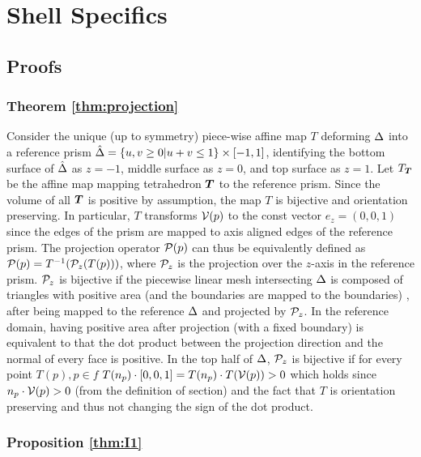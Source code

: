 \chapter{Shell Specifics}
\section{Proofs}
\subsection{Theorem \ref{thm:projection}}\label{app:projection}
Consider the unique (up to symmetry) piece-wise affine map $T$ deforming $\Prism$ into a reference prism $\hat\Prism = \{u,v \geq 0|u+v \leq 1\} \times [-1,1]$, identifying the bottom surface of $\hat\Prism$ as $z=-1$, middle surface as $z=0$, and top surface as $z=1$.
Let $T_{\Tet}$ be the affine map mapping tetrahedron $\Tet$ to the reference prism.
Since the volume of all $\Tet$ is positive by assumption, the map $T$ is bijective and orientation preserving. 
In particular, $T$ transforms $\V(p)$ to the const vector $e_z = (0,0,1)$ since the edges of the prism are mapped to axis aligned edges of the reference prism. The projection operator $\P(p)$ can thus be equivalently defined as $\P(p) = T^{-1}(\P_z(T(p)))$, where $\P_z$ is the projection over the $z$-axis in the reference prism. 
$\P_z$ is bijective if the piecewise linear mesh intersecting $\Prism$ is composed of triangles with positive area (and the boundaries are mapped to the boundaries) \cite{lipman2014bijective}, after being mapped to the reference $\Prism$ and projected by $\P_z$. In the reference domain, having positive area after projection (with a fixed boundary) is equivalent to that the dot product between the projection direction and the normal of every face is positive. In the top half of $\Prism$, $\P_z$ is bijective if for every point $T(p), p \in f$ $T(n_p)\cdot [0,0,1] = T(n_p) \cdot T(\V(p)) > 0$  which holds since $ n_p \cdot \V(p) > 0$ (from the definition of section) and the fact that $T$ is orientation preserving and thus not changing the sign of the dot product.

\subsection{Proposition \ref{thm:I1}}\label{app:I1}

